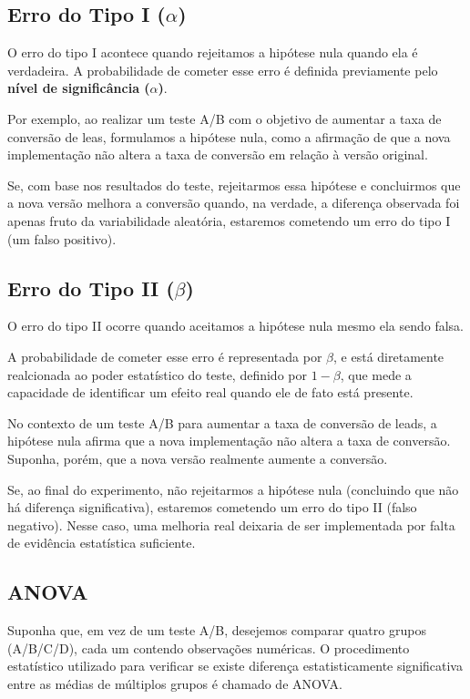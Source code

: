 \documentclass{article}
\begin{document}
\subsection{Erro do Tipo I \texorpdfstring{($\alpha$)}{(α)}}

O erro do tipo I acontece quando rejeitamos a hipótese nula quando ela é verdadeira. A probabilidade de cometer esse erro é definida previamente pelo \textbf{nível de significância ($\alpha$)}. 

Por exemplo, ao realizar um teste A/B com o objetivo de aumentar a taxa de conversão de leas, formulamos a hipótese nula, como a afirmação de que a nova implementação não altera a taxa de conversão em relação à versão original.

Se, com base nos resultados do teste, rejeitarmos essa hipótese e concluirmos que a nova versão melhora a conversão quando, na verdade, a diferença observada foi apenas fruto da variabilidade aleatória, estaremos cometendo um erro do tipo I (um falso positivo).

\subsection{Erro do Tipo II \texorpdfstring{($\beta$)}{β}}

O erro do tipo II ocorre quando aceitamos a hipótese nula mesmo ela sendo falsa. 

A probabilidade de cometer esse erro é representada por $\beta$, e está diretamente realcionada ao poder estatístico do teste, definido por $1 - \beta$, que mede a capacidade de identificar um efeito real quando ele de fato está presente.

No contexto de um teste A/B para aumentar a taxa de conversão de leads, a hipótese nula afirma que a nova implementação não altera a taxa de conversão. Suponha, porém, que a nova versão realmente aumente a conversão.

Se, ao final do experimento, não rejeitarmos a hipótese nula (concluindo que não há diferença significativa), estaremos cometendo um erro do tipo II (falso negativo). Nesse caso, uma melhoria real deixaria de ser implementada por falta de evidência estatística suficiente.

\subsection{ANOVA}

Suponha que, em vez de um teste A/B, desejemos comparar quatro grupos (A/B/C/D), cada um contendo observações numéricas. O procedimento estatístico utilizado para verificar se existe diferença estatisticamente significativa entre as médias de múltiplos grupos é chamado de ANOVA.
\end{document}
